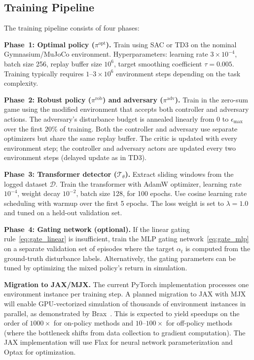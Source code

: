 \documentclass[conference]{IEEEtran}
\newcommand{\cD}{\mathcal{D}}
\newcommand{\cT}{\mathcal{T}}
\newcommand{\piopt}{\pi^{\text{opt}}}
\newcommand{\pirob}{\pi^{\text{rob}}}
\newcommand{\piadv}{\pi^{\text{adv}}}
\begin{document}
\subsection{Training Pipeline}\label{sec:training_pipeline}

The training pipeline consists of four phases:

\textbf{Phase~1: Optimal policy ($\piopt$).}  Train using SAC or TD3 on
the nominal Gymnasium/MuJoCo environment.  Hyperparameters: learning rate
$3 \times 10^{-4}$, batch size 256, replay buffer size $10^6$, target
smoothing coefficient $\tau = 0.005$.  Training typically requires
$1$--$3 \times 10^6$ environment steps depending on the task complexity.

\textbf{Phase~2: Robust policy ($\pirob$) and adversary ($\piadv$).}
Train in the zero-sum game using the modified environment that accepts
both controller and adversary actions.  The adversary's disturbance
budget is annealed linearly from $0$ to $\epsilon_{\max}$ over the first
$20\%$ of training.  Both the controller and adversary use separate
optimizers but share the same replay buffer.  The critic is updated with
every environment step; the controller and adversary actors are updated
every two environment steps (delayed update as in TD3).

\textbf{Phase~3: Transformer detector ($\cT_\theta$).}  Extract sliding
windows from the logged dataset $\cD$.  Train the transformer with
AdamW optimizer, learning rate $10^{-4}$, weight decay $10^{-2}$, batch
size 128, for 100 epochs.  Use cosine learning rate scheduling with
warmup over the first 5 epochs.  The loss weight is set to $\lambda = 1.0$
and tuned on a held-out validation set.

\textbf{Phase~4: Gating network (optional).}  If the linear gating
rule~\eqref{eq:gate_linear} is insufficient, train the MLP gating
network~\eqref{eq:gate_mlp} on a separate validation set of episodes
where the target $\alpha_t$ is computed from the ground-truth disturbance
labels.  Alternatively, the gating parameters can be tuned by optimizing
the mixed policy's return in simulation.

\textbf{Migration to JAX/MJX.}  The current PyTorch implementation
processes one environment instance per training step.  A planned migration
to JAX with MJX~\cite{zakka2025mujoco} will enable
GPU-vectorized simulation of thousands of environment instances in
parallel, as demonstrated by Brax~\cite{freeman2021brax}.  This is
expected to yield speedups on the order of $1000\times$ for on-policy
methods and $10$--$100\times$ for off-policy methods (where the
bottleneck shifts from data collection to gradient computation).  The
JAX implementation will use Flax for neural network parameterization and
Optax for optimization.
\end{document}
